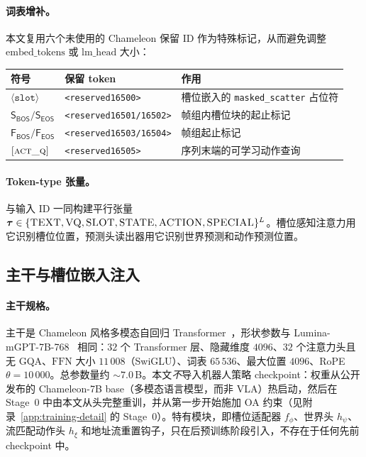 \paragraph{词表增补。}
本文复用六个未使用的 Chameleon 保留 ID 作为特殊标记，从而避免调整 $\mathrm{embed\_tokens}$ 或 $\mathrm{lm\_head}$ 大小：
\begin{center}
\small
\begin{tabular}{lll}
\toprule
符号 & 保留 token & 作用 \\
\midrule
$\langle\texttt{slot}\rangle$           & \texttt{<reserved16500>} & 槽位嵌入的 \texttt{masked\_scatter} 占位符 \\
$\mathsf{S_{BOS}}/\mathsf{S_{EOS}}$      & \texttt{<reserved16501/16502>} & 帧组内槽位块的起止标记 \\
$\mathsf{F_{BOS}}/\mathsf{F_{EOS}}$      & \texttt{<reserved16503/16504>} & 帧组起止标记 \\
$\textsc{[act\_q]}$                      & \texttt{<reserved16505>} & 序列末端的可学习动作查询 \\
\bottomrule
\end{tabular}
\end{center}

\paragraph{Token-type 张量。}
与输入 ID 一同构建平行张量 $\boldsymbol{\tau}\in\{\textsc{TEXT},\textsc{VQ},\textsc{SLOT},\textsc{STATE},\textsc{ACTION},\textsc{SPECIAL}\}^L$。槽位感知注意力用它识别槽位位置，预测头读出器用它识别世界预测和动作预测位置。

\subsection*{主干与槽位嵌入注入}

\paragraph{主干规格。}
主干是 Chameleon 风格多模态自回归 Transformer~\citep{chameleon}，形状参数与 Lumina-mGPT-7B-768~\citep{luminamgpt} 相同：$32$ 个 Transformer 层、隐藏维度 $4096$、$32$ 个注意力头且无 GQA、$\mathrm{FFN}$ 大小 $11\,008$（SwiGLU）、词表 $65\,536$、最大位置 $4096$、RoPE $\theta\!=\!10\,000$。总参数量约 $\sim\!7.0$\,B。本文\emph{不}导入机器人策略 checkpoint：权重从公开发布的 Chameleon-7B base（多模态语言模型，而非 VLA）热启动，然后在 Stage~0 中由本文从头完整重训，并从第一步开始施加 OA 约束（见附录~\ref{app:training-detail} 的 Stage~0）。\method{}特有模块，即槽位适配器 $f_\phi$、世界头 $h_\psi$、流匹配动作头 $h_\xi$ 和地址流重置钩子，只在后预训练阶段引入，不存在于任何先前 checkpoint 中。

